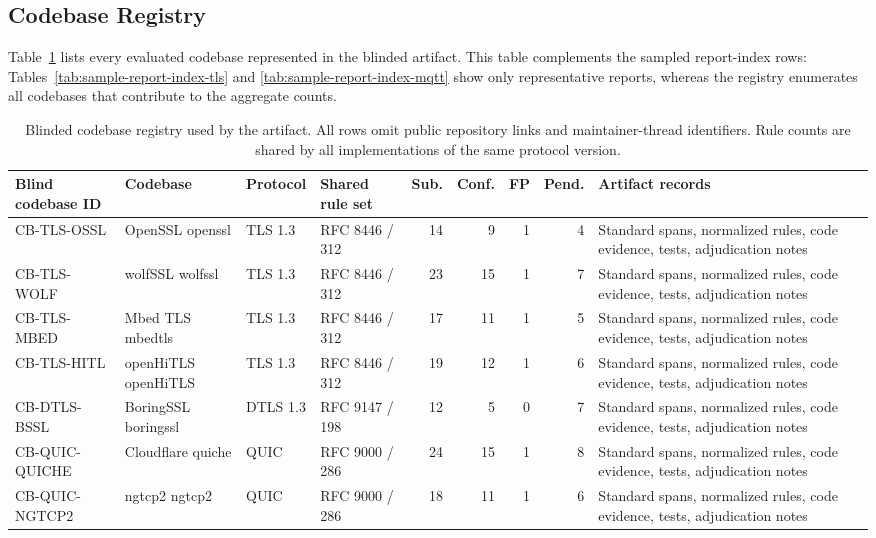 \subsection{Codebase Registry}

Table~\ref{tab:codebase-registry} lists every evaluated codebase represented in
the blinded artifact. This table complements the sampled report-index rows:
Tables~\ref{tab:sample-report-index-tls} and
\ref{tab:sample-report-index-mqtt} show only representative reports, whereas
the registry enumerates all codebases that contribute to the aggregate counts.

\begin{table}[t]
\centering
\caption{Blinded codebase registry used by the artifact. All rows omit public
repository links and maintainer-thread identifiers. Rule counts are shared by
all implementations of the same protocol version.}
\label{tab:codebase-registry}
\small
\renewcommand{\arraystretch}{1.08}
\setlength{\tabcolsep}{3.2pt}
\begin{tabular}{p{}p{}p{}p{}rrrrp{}}
\toprule
\textbf{Blind codebase ID}
& \textbf{Codebase}
& \textbf{Protocol}
& \textbf{Shared rule set}
& \textbf{Sub.}
& \textbf{Conf.}
& \textbf{FP}
& \textbf{Pend.}
& \textbf{Artifact records} \\
\midrule
CB-TLS-OSSL & OpenSSL openssl & TLS 1.3 & RFC 8446 / 312 & 14 & 9 & 1 & 4 & Standard spans, normalized rules, code evidence, tests, adjudication notes \\
CB-TLS-WOLF & wolfSSL wolfssl & TLS 1.3 & RFC 8446 / 312 & 23 & 15 & 1 & 7 & Standard spans, normalized rules, code evidence, tests, adjudication notes \\
CB-TLS-MBED & Mbed TLS mbedtls & TLS 1.3 & RFC 8446 / 312 & 17 & 11 & 1 & 5 & Standard spans, normalized rules, code evidence, tests, adjudication notes \\
CB-TLS-HITL & openHiTLS openHiTLS & TLS 1.3 & RFC 8446 / 312 & 19 & 12 & 1 & 6 & Standard spans, normalized rules, code evidence, tests, adjudication notes \\
CB-DTLS-BSSL & BoringSSL boringssl & DTLS 1.3 & RFC 9147 / 198 & 12 & 5 & 0 & 7 & Standard spans, normalized rules, code evidence, tests, adjudication notes \\
CB-QUIC-QUICHE & Cloudflare quiche & QUIC & RFC 9000 / 286 & 24 & 15 & 1 & 8 & Standard spans, normalized rules, code evidence, tests, adjudication notes \\
CB-QUIC-NGTCP2 & ngtcp2 ngtcp2 & QUIC & RFC 9000 / 286 & 18 & 11 & 1 & 6 & Standard spans, normalized rules, code evidence, tests, adjudication notes \\

\end{tabular}
\end{table}
